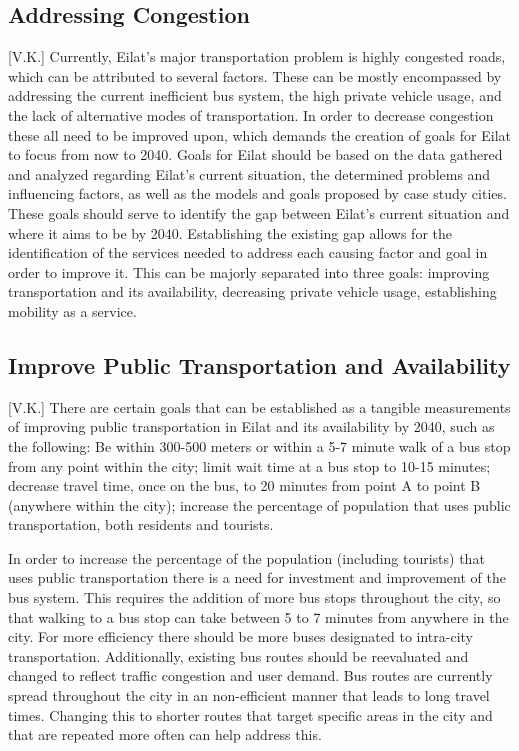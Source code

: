 \documentclass[12pt]{article}                       %
\begin{document}
\subsection{Addressing Congestion}[V.K.]
Currently, Eilat's major transportation problem is highly congested roads, which can be attributed to several factors. These can be mostly encompassed by addressing the current inefficient bus system, the high private vehicle usage, and the lack of alternative modes of transportation. In order to decrease congestion these all need to be improved upon, which demands the creation of goals for Eilat to focus from now to 2040. Goals for Eilat should be based on the data gathered and analyzed regarding Eilat's current situation, the determined problems and influencing factors, as well as the models and goals proposed by case study cities. These goals should serve to identify the gap between Eilat's current situation and where it aims to be by 2040. Establishing the existing gap allows for the identification of the services needed to address each causing factor and goal in order to improve it. This can be majorly separated into three goals: improving transportation and its availability, decreasing private vehicle usage,  establishing mobility as a service. 

\subsection{Improve Public Transportation and Availability}[V.K.]
There are certain goals that can be established as a tangible measurements of improving public transportation in Eilat and its availability by 2040, such as the following: Be within 300-500 meters or within a 5-7 minute walk of a bus stop from any point within the city; limit wait time at a bus stop to 10-15 minutes; decrease travel time, once on the bus, to 20 minutes from point A to point B (anywhere within the city); increase the percentage of population that uses public transportation, both residents and tourists.

In order to increase the percentage of the population (including tourists) that uses public transportation there is a need for investment and improvement of the bus system. This requires the addition of more bus stops throughout the city, so that walking to a bus stop can take between 5 to 7 minutes from anywhere in the city. For more efficiency there should be more buses designated to intra-city transportation. Additionally, existing bus routes should be reevaluated and changed to reflect traffic congestion and user demand. Bus routes are currently spread throughout the city in an non-efficient manner that leads to long travel times. Changing this to shorter routes that target specific areas in the city and that are repeated more often can help address this.
\end{document}
